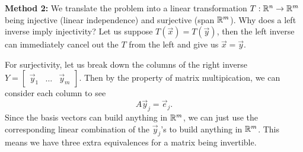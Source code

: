 \textbf{Method 2:}
We translate the problem into a linear transformation $T:\mathbb{R}^n\to\mathbb{R}^m$ being injective (linear independence) and surjective (span $\mathbb{R}^m$).
Why does a left inverse imply injectivity? Let us suppose $T(\vec{x})=T(\vec{y})$, then the left inverse can immediately cancel out the $T$ from the left and give us $\vec{x}=\vec{y}$.

For surjectivity, let us break down the columns of the right inverse $Y=\begin{bmatrix}
    \vec{y}_1 & \ldots &\vec{y}_m
\end{bmatrix}$.
Then by the property of matrix multipication, we can consider each column to see \[
A\vec{y}_j = \vec{e}_j.
\]
Since the basis vectors can build anything in $\mathbb{R}^m$, we can just use the corresponding linear combination of the $\vec{y}_j$'s to build anything in $\mathbb{R}^m$.
This means we have three extra equivalences for a matrix being invertible.

